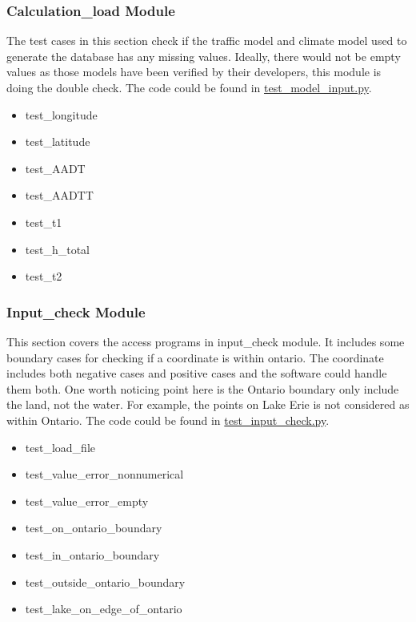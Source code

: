 \documentclass[12pt, titlepage]{article}
\begin{document}
\subsubsection{Calculation\_load Module} \label{CLM}
The test cases in this section check if the traffic model and climate model used to generate the database has any missing values. Ideally, there would not be empty values as those models have been verified by their developers, this module is doing the double check. The code could be found in \href{https://github.com/CynthiaLiu0805/BridgeCorrosion/blob/main/src/database/test_model_input.py}{test\_model\_input.py}.
\begin{itemize}
\item test\_longitude
\item test\_latitude
\item test\_AADT
\item test\_AADTT
\item test\_t1
\item test\_h\_total
\item test\_t2
\end{itemize}

\subsubsection{Input\_check Module} \label{ICM}
This section covers the access programs in input\_check module. It includes some boundary cases for checking if a coordinate is within ontario. The coordinate includes both negative cases and positive cases and the software could handle them both. One worth noticing point here is the Ontario boundary only include the land, not the water. For example, the points on Lake Erie is not considered as within Ontario. The code could be found in \href{https://github.com/CynthiaLiu0805/BridgeCorrosion/blob/main/src/app/test_input_check.py}{test\_input\_check.py}.
\begin{itemize}
\item test\_load\_file
\item test\_value\_error\_nonnumerical
\item test\_value\_error\_empty
\item test\_on\_ontario\_boundary
\item test\_in\_ontario\_boundary
\item test\_outside\_ontario\_boundary
\item test\_lake\_on\_edge\_of\_ontario
\end{itemize}
\end{document}
